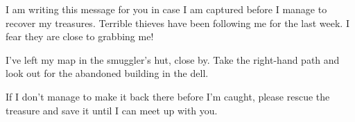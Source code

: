 \documentclass[a5paper, 12pt]{article}
\begin{document}

I am writing this message for you in case I am captured before I manage to recover my treasures.
Terrible thieves have been following me for the last week.
I fear they are close to grabbing me! 

I've left my map in the smuggler's hut, close by.
Take the right-hand path and look out for the abandoned building in the dell. 

If I don't manage to make it back there before I'm caught, please rescue the treasure and save it until I can meet up with you.

\end{document}
